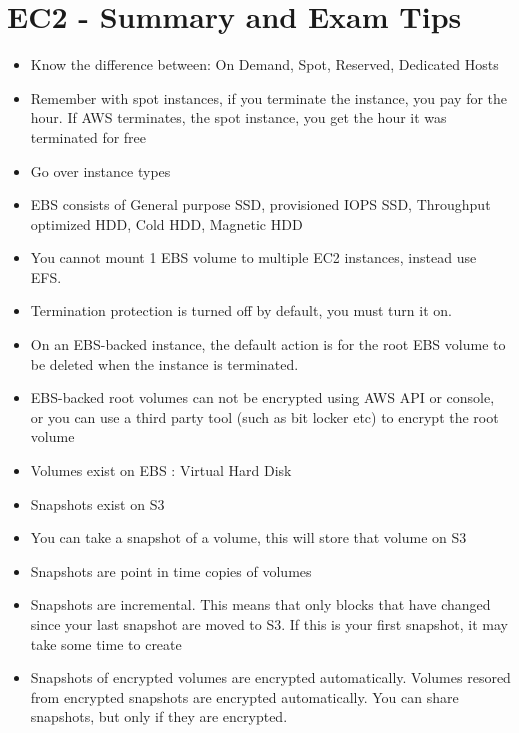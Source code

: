 \documentclass{article}
\begin{document}
\section{EC2 - Summary and Exam Tips}

\begin{itemize}
\item
Know the difference between: On Demand, Spot, Reserved, Dedicated Hosts

\item
Remember with spot instances, if you terminate the instance, you pay for the hour. If AWS terminates, the spot instance, you get the hour it was terminated for free

\item
Go over instance types

\item
EBS consists of General purpose SSD, provisioned IOPS SSD, Throughput optimized HDD, Cold HDD, Magnetic HDD

\item
You cannot mount 1 EBS volume to multiple EC2 instances, instead use EFS.

\item
Termination protection is turned off by default, you must turn it on.

\item
On an EBS-backed instance, the default action is for the root EBS volume to be deleted when the instance is terminated.

\item
EBS-backed root volumes can not be encrypted using AWS API or console, or you can use a third party tool (such as bit locker etc) to encrypt the root volume

\item
Volumes exist on EBS : Virtual Hard Disk

\item
Snapshots exist on S3

\item
You can take a snapshot of a volume, this will store that volume on S3

\item
Snapshots are point in time copies of volumes

\item
Snapshots are incremental. This means that only blocks that have changed since your last snapshot are moved to S3. If this is your first snapshot, it may take some time to create

\item
Snapshots of encrypted volumes are encrypted automatically. Volumes resored from encrypted snapshots are encrypted automatically. You can share snapshots, but only if they are encrypted.


\end{itemize}
\end{document}

